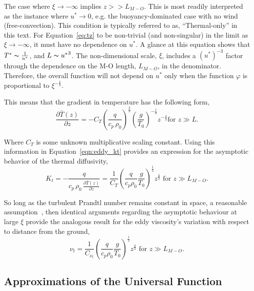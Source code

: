 The case where $\xi \to -\infty $ implies $z>>L_{M-O}$.  
This is most readily interpreted as the instance
where $u^* \to 0$, e.g. the buoyancy-dominated case with no wind
(free-convection). This condition is typically referred to as,
``Thermal-only'' in this text. 
%
For Equation~\ref{eq:tz} to be non-trivial (and
non-singular) in the limit as $\xi \to -\infty$, it must have no
dependence on $u^*$. A glance at this equation shows that
$T^* \thicksim \frac{1}{u^*}$, and $L \thicksim
{u^*}^{3}$. The non-dimensional scale, $\xi$, includes a
$(u^*)^{-3}$ factor through the dependence on the M-O length, 
$L_{M-O}$, in the denominator. 
Therefore, the overall function will not depend on $u^*$ only when
the function $\varphi$ is proportional to  $\xi^{-\frac{4}{3}}$. 

This means that the gradient in temperature has the following form,
\begin{equation}
\frac{\partial \bar T(z)}{\partial z} = -C_T \left(\frac{q}{c_p \,
					      \rho_0}\right)^\frac{2}{3}
\left( \frac{g}{T_0} \right)^{-\frac{1}{3}} z^{-\frac{4}{3}}  \text{
for } z \gg L.
\end{equation}

Where $C_T$ is some unknown multiplicative scaling constant. 
Using this information in Equation~\ref{eqn:eddy_kt} provides an
expression for the asymptotic behavior of the thermal diffusivity, 
\begin{equation}
 K_t = -\frac{q}{c_p \, \rho_0 \, \frac{\partial \bar T(z)}{\partial z}}
  = \frac{1}{C_T} \left( \frac{q}{c_p \rho_0} \frac{g}{T_0}
		     \right)^\frac{1}{3} z^{\frac{4}{3}}  \text{ 
for } z \gg L_{M-O}. 
\end{equation}

So long as the turbulent Prandtl number remains constant in space, a
reasonable assumption~\cite{chuang1969turbulent}, then 
identical arguments regarding the asymptotic behaviour at large $\xi$
provide the analogous result for the eddy viscosity's variation with
respect to distance from the ground,   
\begin{equation}
 \nu_t = \frac{1}{C_{\nu_t}} \left( \frac{q}{c_p \rho_0} \frac{g}{T_0}
			     \right)^\frac{1}{3} z^{\frac{4}{3}}  \text{ 
for } z \gg L_{M-O}. 
\end{equation}


\subsection*{Approximations of the Universal Function}

